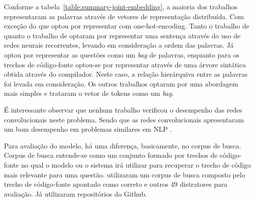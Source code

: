 Conforme a tabela~\ref{table:summary-joint-embedding}, a maioria dos trabalhos representaram as palavras através de vetores de representação distribuída. Com exceção do \cite{iyer-etal-2016-summarizing} que optou por representar com \gls{one-hot-encoding}. Tanto o trabalho de \cite{Gu-deep-code-search:2018} quanto o trabalho de \cite{iyer-etal-2016-summarizing} optaram por representar uma sentença através do uso de redes neurais recorrentes, levando em consideração a ordem das palavras. Já \cite{Allamanis-bimodal-source-code-natural-language:2015} optou por representar as questões como um \textit{bag} de palavras, enquanto para os trechos de código-fonte optou-se por representar através de uma árvore sintática obtida através do compilador. Neste caso, a relação hierárquiva entre as palavras foi levada em consideração. Os outros trabalhos \cite{Chen-bi-variational-autoencoder:2018, Sachdev-neural-code-search:2018, cambronero-deep-learning-code-search:2019} optaram por uma abordagem mais simples e trataram o vetor de tokens como um \textit{bag}.

É interessante observar que nenhum trabalho verificou o desempenho das redes convolucionais neste problema. Sendo que as redes convolucionais apresentaram um bom desempenho em problemas similares em NLP \citep{lai-etal-2018-review, tan-lstm-qa, feng-2015}.

Para avaliação do modelo, há uma diferença, basicamente, no corpus de busca. Corpus de busca entende-se como um conjunto formado por trechos de código-fonte no qual o modelo ou o sistema irá utilizar para recuperar o trecho de código mais relevante para uma questão. \cite{iyer-etal-2016-summarizing, Chen-bi-variational-autoencoder:2018} utilizaram um corpus de busca composto pelo trecho de código-fonte apontado como correto e outros 49 distratores para avaliação. Já \cite{Gu-deep-code-search:2018, Sachdev-neural-code-search:2018, cambronero-deep-learning-code-search:2019} utilizaram repositórios do Github.  


